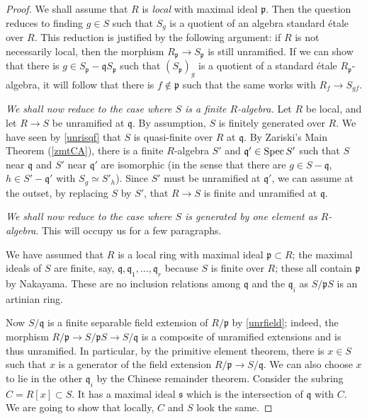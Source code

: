 \begin{proof}We shall assume that $R$ is \emph{local} with maximal ideal
$\mathfrak{p}$. Then the question reduces to finding
$g \in S$ such that $S_g$ is a quotient of an algebra standard \'etale over $R$. 
This reduction is justified by the following argument: if $R$ is 
not necessarily local, then the morphism $R_{\mathfrak{p}} \to
S_{\mathfrak{p}}$ is still unramified. If we can show that there is $g \in
S_{\mathfrak{p}} - \mathfrak{q}S_{\mathfrak{p}}$ such
that $(S_{\mathfrak{p}})_g$ is a quotient of a standard \'etale
$R_{\mathfrak{p}}$-algebra, it 
will follow that there is $f \notin \mathfrak{p}$ such that the same works
with $R_f \to S_{gf}$.

\emph{We shall now reduce to the case where $S$ is a finite $R$-algebra.}
Let $R$ be local, and let $R \to S$ be unramified at $\mathfrak{q}$. By assumption, $S$ is finitely generated over $R$.
We have seen by \cref{unrisqf} that $S$ is quasi-finite over $R$ at
$\mathfrak{q}$.
By Zariski's Main Theorem (\cref{zmtCA}), there is a finite
$R$-algebra $S'$ and $\mathfrak{q} ' \in \operatorname{Spec} S'$ such that $S$ near
$\mathfrak{q}$ and $S'$ near $\mathfrak{q}'$ are isomorphic (in
the sense that there are $g \in S-\mathfrak{q}$, $h \in S' -
\mathfrak{q}'$ with $S_g \simeq S'_h$). 
Since $S'$ must be unramified at $\mathfrak{q}'$, we can assume at
the outset, by
replacing $S$ by $S'$, that $R
\to S$ is finite and unramified at $\mathfrak{q}$.


\emph{We shall now reduce to the case where $S$ is generated by one element as
$R$-algebra}. This will occupy us for a few paragraphs.

We have assumed that $R$ is a local ring with maximal ideal $\mathfrak{p} \subset R$; the
maximal ideals of $S$ are finite, say, $\mathfrak{q},\mathfrak{q}_1, \dots,
\mathfrak{q}_r$ because $S$ is finite over $R$; these all contain $\mathfrak{p}$ by Nakayama. 
These are no inclusion relations among $\mathfrak{q}$ and the $\mathfrak{q}_i$
as $S/\mathfrak{p}S$ is an artinian ring.

Now $S/\mathfrak{q}$ is a finite separable field extension of
$R/\mathfrak{p}$ by \cref{unrfield}; indeed, the morphism $R/\mathfrak{p}
\to S/\mathfrak{p}S \to S/\mathfrak{q}$ is a composite of
unramified extensions and is thus unramified. In particular, by the primitive element theorem, there is $x \in S$ such that $x$ is a
generator of the field extension $R/\mathfrak{p} \to S/\mathfrak{q}$.
We can also choose $x$ to lie in the other $\mathfrak{q}_i$ by the Chinese
remainder theorem. 
Consider the subring $C=R[x] \subset S$.
It has a maximal ideal $\mathfrak{s}$ which is the intersection of
$\mathfrak{q}$ with $C$.
We are going to show that locally, $C$ and $S$ look the same.


\end{proof}
